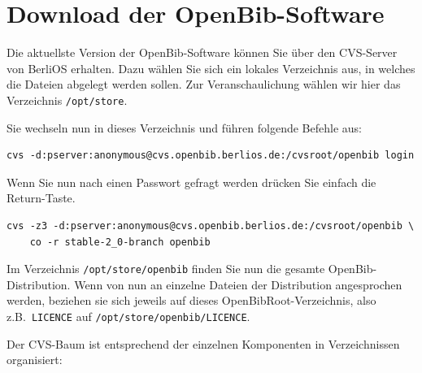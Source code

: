 \documentclass[11pt, twoside, a4paper, BCOR8mm, DIV12, bibtotoc,idxtotoc]{scrbook}
\begin{document}
\chapter{Download der OpenBib-Software}

Die aktuellste Version der OpenBib-Software können Sie über den
CVS-Server von BerliOS erhalten. Dazu wählen Sie sich ein lokales
Verzeichnis aus, in welches die Dateien abgelegt werden sollen. Zur
Veranschaulichung wählen wir hier das Verzeichnis \texttt{/opt/store}.

Sie wechseln nun in dieses Verzeichnis und führen folgende Befehle
aus: 

\begin{verbatim}
cvs -d:pserver:anonymous@cvs.openbib.berlios.de:/cvsroot/openbib login
\end{verbatim}

Wenn Sie nun nach einen Passwort gefragt werden drücken Sie einfach
die Return-Taste.

\begin{verbatim}
cvs -z3 -d:pserver:anonymous@cvs.openbib.berlios.de:/cvsroot/openbib \
    co -r stable-2_0-branch openbib
\end{verbatim}

Im Verzeichnis \texttt{/opt/store/openbib} finden Sie nun die gesamte
OpenBib-Distribution. Wenn von nun an einzelne Dateien der
Distribution angesprochen werden, beziehen sie sich jeweils auf dieses
OpenBibRoot-Verzeichnis, also z.B.~\texttt{LICENCE} auf \texttt{/opt/store/openbib/LICENCE}.

Der CVS-Baum ist entsprechend der einzelnen Komponenten in
Verzeichnissen organisiert:
\end{document}
